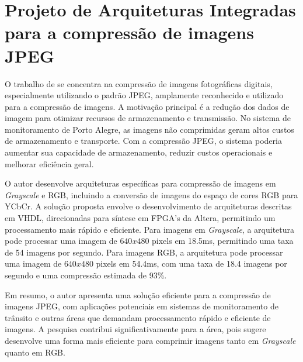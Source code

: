 \section{Projeto de Arquiteturas Integradas para a compressão de imagens \acrshort{JPEG}}
O trabalho de  se concentra na compressão de imagens fotográficas digitais, especialmente utilizando o padrão \acrshort{JPEG}, amplamente reconhecido e utilizado para a compressão de imagens. A motivação principal é a redução dos dados de imagem para otimizar recursos de armazenamento e transmissão. No sistema de monitoramento de Porto Alegre, as imagens não comprimidas geram altos custos de armazenamento e transporte. Com a compressão \acrshort{JPEG}, o sistema poderia aumentar sua capacidade de armazenamento, reduzir custos operacionais e melhorar eficiência geral.

O autor desenvolve arquiteturas específicas para compressão de imagens em \textit{Grayscale} e \acrshort{RGB}, incluindo a conversão de imagens do espaço de cores \acrshort{RGB} para YCbCr. A solução proposta envolve o desenvolvimento de arquiteturas descritas em VHDL, direcionadas para síntese em FPGA's da Altera, permitindo um processamento mais rápido e eficiente. Para imagens em \textit{Grayscale}, a arquitetura pode processar uma imagem de $640x480$ pixels em 18.5ms, permitindo uma taxa de 54 imagens por segundo. Para imagens \acrshort{RGB}, a arquitetura pode processar uma imagem de $640x480$ pixels em 54.4ms, com uma taxa de 18.4 imagens por segundo e uma compressão estimada de 93\%.

Em resumo, o autor apresenta uma solução eficiente para a compressão de imagens \acrshort{JPEG}, com aplicações potenciais em sistemas de monitoramento de trânsito e outras áreas que demandam processamento rápido e eficiente de imagens. A pesquisa contribui significativamente para a área, pois sugere desenvolve uma forma mais eficiente para comprimir imagens tanto em \textit{Grayscale} quanto em \acrshort{RGB}.